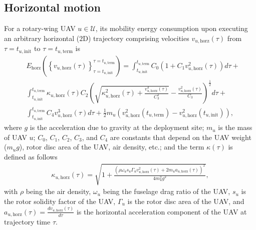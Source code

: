 \documentclass{article}
\begin{document}
\subsection{Horizontal motion}
For a rotary-wing UAV $u{\in}\mathcal{U}$, its mobility energy consumption upon executing an arbitrary horizontal ($2$D) trajectory comprising velocities $v_{u,\mathrm{horz}}(\tau)$ from $\tau{=}t_{u,\mathrm{init}}$ to $\tau{=}t_{u,\mathrm{term}}$ is
\begin{align}\label{Horizontal_energy}
    &E_{\mathrm{horz}}\left(\left\{v_{u,\mathrm{horz}}(\tau)\right\}_{\tau{=}t_{u,\mathrm{init}}}^{\tau{=}t_{u,\mathrm{term}}}\right){=}\int_{t_{u,\mathrm{init}}}^{t_{u,\mathrm{term}}}C_{0}\left(1{+}C_{1}v_{u,\mathrm{horz}}^{2}(\tau)\right)d\tau{+}\\&\int_{t_{u,\mathrm{init}}}^{t_{u,\mathrm{term}}}\kappa_{u,\mathrm{horz}}(\tau)C_{2}\left(\sqrt{\kappa_{u,\mathrm{horz}}^{2}(\tau){+}\frac{v_{u,\mathrm{horz}}^{4}(\tau)}{C_{3}^{2}}}{-}\frac{v_{u,\mathrm{horz}}^{2}(\tau)}{C_{3}}\right)^{\frac{1}{2}}d\tau{+}\nonumber\\&\int_{t_{u,\mathrm{init}}}^{t_{u,\mathrm{term}}}C_{4}v_{u,\mathrm{horz}}^{3}(\tau)d\tau{+}\frac{1}{2}m_{u}\left(v_{u,\mathrm{horz}}^{2}(t_{u,\mathrm{term}}){-}v_{u,\mathrm{horz}}^{2}(t_{u,\mathrm{init}})\right),\nonumber
\end{align}
where $g$ is the acceleration due to gravity at the deployment site; $m_{u}$ is the mass of UAV $u$; $C_{0}$, $C_{1}$, $C_{2}$, $C_{3}$, and $C_{4}$ are constants that depend on the UAV weight ($m_{u}g$), rotor disc area of the UAV, air density, etc.; and the term $\kappa(\tau)$ is defined as follows
\begin{align}\label{Kappa_term_horz}
    \kappa_{u,\mathrm{horz}}(\tau){=}\sqrt{1{+}\frac{\left(\rho\omega_{u}s_{u}\Gamma_{u}v_{u,\mathrm{horz}}^{2}(\tau){+}2m_{u}a_{u,\mathrm{horz}}(\tau)\right)^{2}}{4m_{u}^{2}g^{2}}},
\end{align}
with $\rho$ being the air density, $\omega_{u}$ being the fuselage drag ratio of the UAV, $s_{u}$ is the rotor solidity factor of the UAV, $\Gamma_{u}$ is the rotor disc area of the UAV, and $a_{u,\mathrm{horz}}(\tau){=}\frac{dv_{u,\mathrm{horz}}(\tau)}{d\tau}$ is the horizontal acceleration component of the UAV at trajectory time $\tau$.
\end{document}
